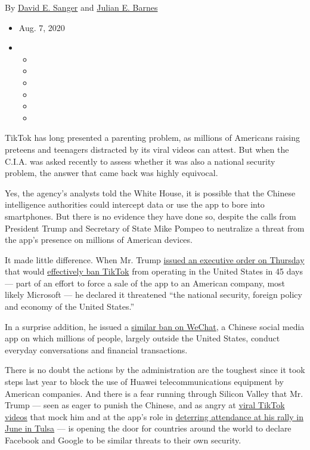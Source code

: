 By \href{https://www.nytimes.com/by/david-e-sanger}{David E. Sanger} and
\href{https://www.nytimes.com/by/julian-e-barnes}{Julian E. Barnes}

\begin{itemize}
\item
  Aug. 7, 2020
\item
  \begin{itemize}
  \item
  \item
  \item
  \item
  \item
  \item
  \end{itemize}
\end{itemize}

TikTok has long presented a parenting problem, as millions of Americans
raising preteens and teenagers distracted by its viral videos can
attest. But when the C.I.A. was asked recently to assess whether it was
also a national security problem, the answer that came back was highly
equivocal.

Yes, the agency's analysts told the White House, it is possible that the
Chinese intelligence authorities could intercept data or use the app to
bore into smartphones. But there is no evidence they have done so,
despite the calls from President Trump and Secretary of State Mike
Pompeo to neutralize a threat from the app's presence on millions of
American devices.

It made little difference. When Mr. Trump
\href{https://www.nytimes.com/2020/08/06/technology/trump-wechat-tiktok-china.html}{issued
an executive order on Thursday} that would
\href{https://www.whitehouse.gov/presidential-actions/executive-order-addressing-threat-posed-tiktok/}{effectively
ban TikTok} from operating in the United States in 45 days --- part of
an effort to force a sale of the app to an American company, most likely
Microsoft --- he declared it threatened ``the national security, foreign
policy and economy of the United States.''

In a surprise addition, he issued a
\href{https://www.whitehouse.gov/presidential-actions/executive-order-addressing-threat-posed-wechat/}{similar
ban on WeChat}, a Chinese social media app on which millions of people,
largely outside the United States, conduct everyday conversations and
financial transactions.

There is no doubt the actions by the administration are the toughest
since it took steps last year to block the use of Huawei
telecommunications equipment by American companies. And there is a fear
running through Silicon Valley that Mr. Trump --- seen as eager to
punish the Chinese, and as angry at
\href{https://www.nytimes.com/2020/05/27/arts/television/trump-sarah-cooper.html}{viral
TikTok videos} that mock him and at the app's role in
\href{https://www.nytimes.com/2020/06/21/style/tiktok-trump-rally-tulsa.html}{deterring
attendance at his rally in June in Tulsa} --- is opening the door for
countries around the world to declare Facebook and Google to be similar
threats to their own security.

